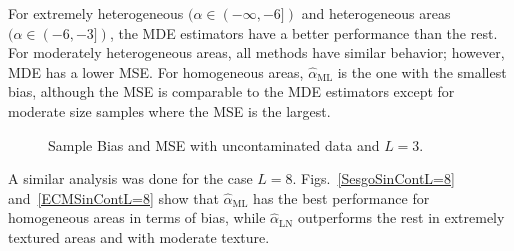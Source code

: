 \documentclass[twocolumn]{svjour3}
\begin{document}
For extremely heterogeneous $(\alpha \in (-\infty,-6])$ and heterogeneous areas $(\alpha \in (-6,-3])$, the MDE estimators have a better performance than the rest. 
For moderately heterogeneous areas, all methods have similar behavior; however, MDE has a lower MSE. 
For homogeneous areas, $\widehat{\alpha}_{\text{{ML}}}$ is the one with the smallest bias, although the MSE is comparable to the MDE estimators except for moderate size samples where the MSE is the largest.

\begin{figure}[hbt]
	\centering
	\caption{Sample Bias and MSE with uncontaminated data and $L=3$.}\label{SesgoyECMSinContL=3} 
\end{figure}    

A similar analysis was done for the case $L=8$. Figs.~\ref{SesgoSinContL=8} and~\ref{ECMSinContL=8} show that $\widehat{\alpha}_{\text{{ML}}}$ has the best performance for homogeneous
areas in terms of bias, while $\widehat{\alpha}_{\text{{LN}}}$ outperforms the rest in extremely textured areas and with moderate texture.
\end{document}
